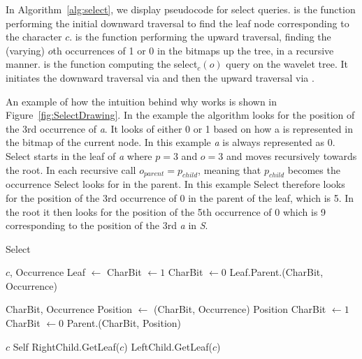 In Algorithm~\ref{alg:select}, we display pseudocode for select queries.
 is the function performing the initial downward traversal to find the leaf node corresponding to the character $c$.
 is the function performing the upward traversal, finding the (varying) $o$th occurrences of 1 or 0 in the bitmaps up the tree, in a recursive manner.
 is the function computing the select$_{c}(o)$ query on the wavelet tree.
It initiates the downward traversal via  and then the upward traversal via .

An example of how the intuition behind why  works is shown in Figure~\ref{fig:SelectDrawing}.
In the example the algorithm looks for the position of the 3rd occurrence of \textit{a}.
It looks of either 0 or 1 based on how a is represented in the bitmap of the current node. In this example \textit{a} is always represented as 0.
Select starts in the leaf of \textit{a} where $p = 3$ and $o = 3$ and moves recursively towards the root. In each recursive call $o_{parent} = p_{child}$, meaning that $p_{child}$ becomes the occurrence Select looks for in the parent. In this example Select therefore looks for the position of the 3rd occurrence of 0 in the parent of the leaf, which is 5. In the root it then looks for the position of the 5th occurrence of 0 which is 9 corresponding to the position of the 3rd \textit{a} in \textit{S}.

\begin{algorithm}
\caption{Select}
\label{alg:select}
\begin{algorithmic} 
 {$c$, Occurrence}
\State Leaf $\gets$ 
	\State CharBit $\gets 1$
\Else
	\State CharBit $\gets 0$
\EndIf
\State \Return Leaf.Parent.(CharBit, Occurrence)
\EndFunction

\vspace{5mm}

 {CharBit, Occurrence}
\State Position $\gets$ (CharBit, Occurrence)
	\State \Return Position
\EndIf
{}
	\State CharBit $\gets 1$
\Else
	\State CharBit $\gets 0$
\EndIf
\State \Return Parent.(CharBit, Position)
\EndFunction

\vspace{5mm}

 {$c$}
	\State \Return Self
\EndIf
{}
	\State \Return RightChild.GetLeaf($c$)
\Else
	\State \Return LeftChild.GetLeaf($c$)
\EndIf
\EndFunction
\end{algorithmic}
\end{algorithm}

